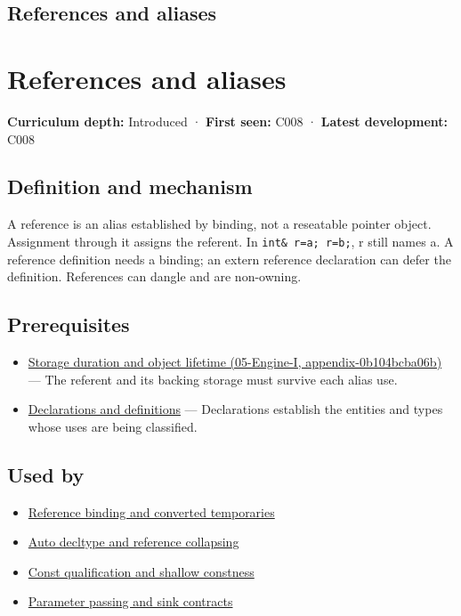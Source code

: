 \hypertarget{appendix-d6d562ca9fbb}{}
\section*{References and aliases}
\chapter{References and aliases}\label{appendix-d6d562ca9fbb-references-and-aliases}

\textbf{Curriculum depth:} Introduced · \textbf{First seen:} C008 · \textbf{Latest development:} C008

\section{Definition and mechanism}\label{appendix-d6d562ca9fbb-definition-and-mechanism}

A reference is an alias established by binding, not a reseatable pointer object. Assignment through it assigns the referent. In \texttt{int\&\ r=a;\ r=b;}, r still names a. A reference definition needs a binding; an extern reference declaration can defer the definition. References can dangle and are non-owning.

\section{Prerequisites}\label{appendix-d6d562ca9fbb-prerequisites}

\begin{itemize}
\tightlist
\item
  \href{../05-Engine-I/main.pdf\#nameddest=appendix-0b104bcba06b}{Storage duration and object lifetime (05-Engine-I, appendix-0b104bcba06b)} --- The referent and its backing storage must survive each alias use.
\item
  \hyperref[appendix-2e4d494c2d94]{Declarations and definitions} --- Declarations establish the entities and types whose uses are being classified.
\end{itemize}

\section{Used by}\label{appendix-d6d562ca9fbb-used-by}

\begin{itemize}
\tightlist
\item
  \hyperref[appendix-37856d997bb0]{Reference binding and converted temporaries}
\item
  \hyperref[appendix-5d4252a42886]{Auto decltype and reference collapsing}
\item
  \hyperref[appendix-c25d60fed375]{Const qualification and shallow constness}
\item
  \hyperref[appendix-d5908f75721f]{Parameter passing and sink contracts}
\end{itemize}

